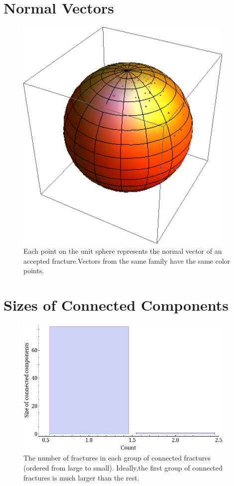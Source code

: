 \documentclass[a4paper,11pt]{article}
\begin{document}
\section{Normal Vectors}
\begin{figure}[H]
   \centering
    \includegraphics[width=300pt]{norm.png}
\caption[Normal vectors.]{Each point on the unit sphere represents the normal vector of an accepted fracture.Vectors from the same family have the same color points.}
\end{figure}


\section{Sizes of Connected Components}
\begin{figure}[H]
   \centering
   \includegraphics[width=300pt]{graphConnectedSize.png}
\caption[Sizes of connected components]{The number of fractures in each group of connected fractures (ordered from large to small). Ideally,the first group of connected fractures is much larger than the rest.}
\end{figure}
\end{document}
